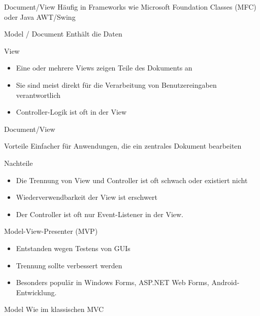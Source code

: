 
\begin{frame}{Document/View}
	Häufig in Frameworks wie Microsoft Foundation Classes (MFC) oder Java AWT/Swing
	\pause
	\begin{block}{Model / Document}
		Enthält die Daten
	\end{block}
	\begin{block}{View}
		\begin{itemize}
		  \item Eine oder mehrere Views zeigen Teile des Dokuments an
		  \item Sie sind meist direkt für die Verarbeitung von Benutzereingaben verantwortlich
		  \item Controller-Logik ist oft in der View
		\end{itemize}
	\end{block}	
\end{frame}

\begin{frame}{Document/View}
	\begin{exampleblock}{Vorteile}
		Einfacher für Anwendungen, die ein zentrales \glqq Dokument{\grqq} bearbeiten
	\end{exampleblock}
	\pause
	\begin{alertblock}{Nachteile}
		\begin{itemize}
		  \item Die Trennung von View und Controller ist oft schwach oder existiert nicht
		  \item Wiederverwendbarkeit der View ist erschwert
		  \item Der \glqq Controller{\grqq} ist oft nur Event-Listener in der View.
		\end{itemize}
	\end{alertblock}
\end{frame}

\begin{frame}{Model-View-Presenter (MVP)}
	\begin{itemize}
	  \item Entstanden wegen Testens von GUIs
	  \item Trennung sollte verbessert werden
	  \item Besonders populär in Windows Forms, ASP.NET Web Forms, Android-Entwicklung.
	\end{itemize}
	\pause
	\begin{block}{Model}
		Wie im klassischen MVC
	\end{block}
\end{frame}


